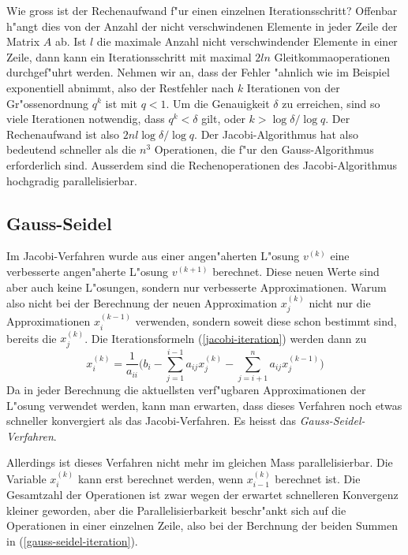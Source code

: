 Wie gross ist der Rechenaufwand f"ur einen einzelnen Iterationsschritt?
Offenbar h"angt dies von der Anzahl der nicht verschwindenen Elemente 
in jeder Zeile der Matrix $A$ ab.
Ist $l$ die maximale Anzahl nicht verschwindender Elemente in einer Zeile,
dann kann ein Iterationsschritt mit maximal $2ln$ Gleitkommaoperationen
durchgef"uhrt werden. Nehmen wir an, dass der Fehler "ahnlich wie im Beispiel
exponentiell abnimmt, also der Restfehler nach $k$ Iterationen von der
Gr"ossenordnung $q^k$ ist mit $q<1$.
Um die Genauigkeit $\delta$ zu erreichen, sind so viele Iterationen notwendig,
dass $q^k < \delta$ gilt, oder $k>\log \delta/\log q$.
Der Rechenaufwand ist also $2nl\log\delta/\log q$.
Der Jacobi-Algorithmus hat also bedeutend schneller als die $n^3$ 
Operationen, die f"ur den Gauss-Algorithmus erforderlich sind.
Ausserdem sind die Rechenoperationen des Jacobi-Algorithmus hochgradig
parallelisierbar.

\subsection{Gauss-Seidel}
Im Jacobi-Verfahren wurde aus einer angen"aherten L"osung $v^{(k)}$
eine verbesserte angen"aherte L"osung $v^{(k+1)}$ berechnet.
Diese neuen Werte sind aber auch keine L"osungen, sondern nur verbesserte
Approximationen.
Warum also nicht bei der Berechnung der neuen Approximation $x_j^{(k)}$
nicht nur die Approximationen $x_i^{(k-1)}$ verwenden, sondern soweit
diese schon bestimmt sind, bereits die $x_j^{(k)}$.
Die Iterationsformeln (\ref{jacobi-iteration}) werden dann zu
\begin{equation}
x_i^{(k)}=\frac1{a_{ii}}\biggl(b_i
-\sum_{j=1}^{i-1}a_{ij}x_j^{(k)}
-\sum_{j=i+1}^na_{ij}x_j^{(k-1)}
\biggr)
\label{gauss-seidel-iteration}
\end{equation}
Da in jeder Berechnung die aktuellsten verf"ugbaren Approximationen der
L"osung verwendet werden, kann man erwarten, dass dieses Verfahren
noch etwas schneller konvergiert als das Jacobi-Verfahren.
Es heisst das {\em Gauss-Seidel-Verfahren}.

Allerdings ist dieses Verfahren nicht mehr im gleichen Mass parallelisierbar.
Die Variable $x_i^{(k)}$ kann erst berechnet werden, wenn $x_{i-1}^{(k)}$
berechnet ist. Die Gesamtzahl der Operationen ist zwar wegen der erwartet
schnelleren Konvergenz kleiner geworden, aber die Parallelisierbarkeit
beschr"ankt sich auf die Operationen in einer einzelnen Zeile, also
bei der Berchnung der beiden Summen in (\ref{gauss-seidel-iteration}).


